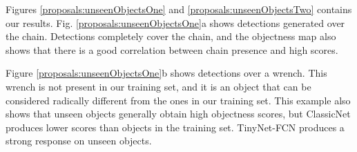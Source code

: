 Figures \ref{proposals:unseenObjectsOne} and \ref{proposals:unseenObjectsTwo} contains our results. Fig. \ref{proposals:unseenObjectsOne}a shows detections generated over the chain. Detections completely cover the chain, and the objectness map also shows that there is a good correlation between chain presence and high scores.

Figure \ref{proposals:unseenObjectsOne}b shows detections over a wrench. This wrench is not present in our training set, and it is an object that can be considered radically different from the ones in our training set. This example also shows that unseen objects generally obtain high objectness scores, but ClassicNet produces lower scores than objects in the training set. TinyNet-FCN produces a strong response on unseen objects.

\begin{figure}[!t]
    \centering	
\end{figure}
